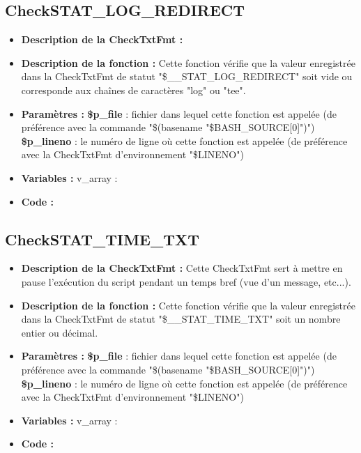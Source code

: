 \documentclass[a4paper,10pt]{article}
\begin{document}
\color{green}
\subsection{CheckSTAT\_LOG\_REDIRECT}\color{white}
\begin{itemize}
    \item \textbf{Description de la CheckTxtFmt :}

    \item \textbf{Description de la fonction :} Cette fonction vérifie que la valeur enregistrée dans la CheckTxtFmt de statut "\$\_\_STAT\_LOG\_REDIRECT" soit vide ou corresponde aux chaînes de caractères "log" ou "tee".

    \item \textbf{Paramètres :}
        \color{orange}\textbf{\$p\_file}\color{white} : fichier dans lequel cette fonction est appelée (de préférence avec la commande "\$(\color{gray}basename \color{white}"\color{orange}\$BASH\_SOURCE[0]\color{white}")")
    \color{orange}\textbf{\$p\_lineno}\color{white} : le numéro de ligne où cette fonction est appelée (de préférence avec la CheckTxtFmt d'environnement "\color{orange}\$LINENO\color{white}")

    \item \textbf{Variables :} v\_array :

    \item \textbf{Code :}
\end{itemize}

\color{green}
\subsection{CheckSTAT\_TIME\_TXT}\color{white}
\begin{itemize}
    \item \textbf{Description de la CheckTxtFmt :} Cette CheckTxtFmt sert à mettre en pause l'exécution du script pendant un temps bref (vue d'un message, etc...).

    \item \textbf{Description de la fonction :} Cette fonction vérifie que la valeur enregistrée dans la CheckTxtFmt de statut "\$\_\_STAT\_TIME\_TXT" soit un nombre entier ou décimal.

    \item \textbf{Paramètres :}
        \color{orange}\textbf{\$p\_file}\color{white} : fichier dans lequel cette fonction est appelée (de préférence avec la commande "\$(\color{gray}basename \color{white}"\color{orange}\$BASH\_SOURCE[0]\color{white}")")
    \color{orange}\textbf{\$p\_lineno}\color{white} : le numéro de ligne où cette fonction est appelée (de préférence avec la CheckTxtFmt d'environnement "\color{orange}\$LINENO\color{white}")

    \item \textbf{Variables :} v\_array :

    \item \textbf{Code :}
\end{itemize}
\end{document}
